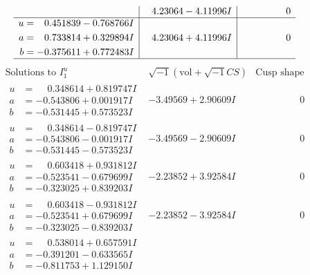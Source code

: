 \documentclass[1p]{elsarticle_modified}
\theoremstyle{definition}
\newcommand{\I}{\sqrt{-1}}
\begin{document}
$$\begin{array}{c|c|c}
 & \phantom{-}4.23064 - 4.11996 I & \phantom{-0.000000 } 0 \\ \hline\begin{aligned}
u &= \phantom{-}0.451839 - 0.768766 I \\
a &= \phantom{-}0.733814 + 0.329894 I \\
b &= -0.375611 + 0.772483 I\end{aligned}
 & \phantom{-}4.23064 + 4.11996 I & \phantom{-0.000000 } 0\\
 \hline 
 \end{array}$$\newpage$$\begin{array}{c|c|c}  
\text{Solutions to }I^u_{1}& \I (\text{vol} + \sqrt{-1}CS) & \text{Cusp shape}\\
 \hline 
\begin{aligned}
u &= \phantom{-}0.348614 + 0.819747 I \\
a &= -0.543806 + 0.001917 I \\
b &= -0.531445 + 0.573523 I\end{aligned}
 & -3.49569 + 2.90609 I & \phantom{-0.000000 } 0 \\ \hline\begin{aligned}
u &= \phantom{-}0.348614 - 0.819747 I \\
a &= -0.543806 - 0.001917 I \\
b &= -0.531445 - 0.573523 I\end{aligned}
 & -3.49569 - 2.90609 I & \phantom{-0.000000 } 0 \\ \hline\begin{aligned}
u &= \phantom{-}0.603418 + 0.931812 I \\
a &= -0.523541 - 0.679699 I \\
b &= -0.323025 + 0.839203 I\end{aligned}
 & -2.23852 + 3.92584 I & \phantom{-0.000000 } 0 \\ \hline\begin{aligned}
u &= \phantom{-}0.603418 - 0.931812 I \\
a &= -0.523541 + 0.679699 I \\
b &= -0.323025 - 0.839203 I\end{aligned}
 & -2.23852 - 3.92584 I & \phantom{-0.000000 } 0 \\ \hline\begin{aligned}
u &= \phantom{-}0.538014 + 0.657591 I \\
a &= -0.391201 - 0.633565 I \\
b &= -0.811753 + 1.129150 I\end{aligned}

\end{array}$$
\end{document}
